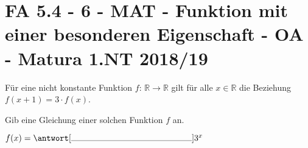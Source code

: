 \section{FA 5.4 - 6 - MAT - Funktion mit einer besonderen Eigenschaft - OA - Matura 1.NT 2018/19}

\begin{beispiel}[FA 5.4]{1}
Für eine nicht konstante Funktion $f$: $\mathbb{R}\rightarrow\mathbb{R}$ gilt für alle $x\in\mathbb{R}$ die Beziehung $f(x+1)=3\cdot f(x)$.

Gib eine Gleichung einer solchen Funktion $f$ an.\leer

$f(x)=\antwort[\rule{5cm}{0.3pt}]{3^x}$

\end{beispiel}